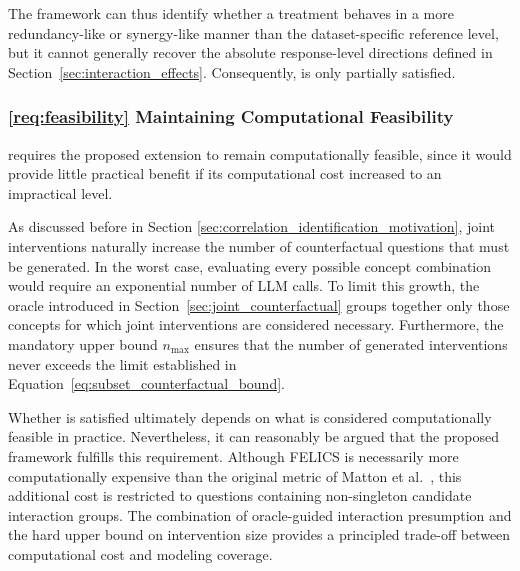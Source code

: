 The framework can thus identify whether a treatment behaves in a more redundancy-like or synergy-like manner than the dataset-specific reference level, but it cannot generally recover the absolute response-level directions defined in Section~\ref{sec:interaction_effects}. Consequently,  is only partially satisfied.

\subsubsection{\ref{req:feasibility} Maintaining Computational Feasibility}

 requires the proposed extension to remain computationally feasible, since it would provide little practical benefit if its computational cost increased to an impractical level.

As discussed before in Section \ref{sec:correlation_identification_motivation}, joint interventions naturally increase the number of counterfactual questions that must be generated. In the worst case, evaluating every possible concept combination would require an exponential number of LLM calls. To limit this growth, the oracle introduced in Section~\ref{sec:joint_counterfactual} groups together only those concepts for which joint interventions are considered necessary. Furthermore, the mandatory upper bound $n_{\max}$ ensures that the number of generated interventions never exceeds the limit established in Equation~\ref{eq:subset_counterfactual_bound}.

Whether  is satisfied ultimately depends on what is considered computationally feasible in practice. Nevertheless, it can reasonably be argued that the proposed framework fulfills this requirement. Although FELICS is necessarily more computationally expensive than the original metric of Matton et al.~\cite{mattonWalkTalkMeasuring2024}, this additional cost is restricted to questions containing non-singleton candidate interaction groups. The combination of oracle-guided interaction presumption and the hard upper bound on intervention size provides a principled trade-off between computational cost and modeling coverage.
